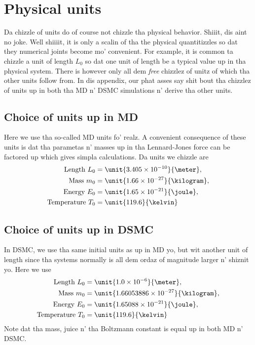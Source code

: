 \chapter{Physical units}
\label{app:physical_units}
Da chizzle of units do of course not chizzle tha physical behavior. Shiiit, dis aint no joke. Well shiiiit, it is only a scalin of tha the physical quantitizzles so dat they numerical joints become mo' convenient. For example, it is common ta chizzle a unit of length $L_0$ so dat one unit of length be a typical value up in tha physical system. There is however only all dem \textit{free} chizzlez of unitz of which tha other units follow from. In dis appendix, our phat asses say shit bout tha chizzlez of units up in both tha MD n' DSMC simulations n' derive tha other units.
\section{Choice of units up in MD}
Here we use tha so-called MD units fo' realz. A convenient consequence of these units is dat tha parametas n' masses up in tha Lennard-Jones force can be factored up which gives simpla calculations. Da units we chizzle are
\begin{align}
	\text{Length } L_0 &= \unit{3.405\e{-10}}{\meter},\\
	\text{Mass } m_0 &= \unit{1.66\e{-27}}{\kilogram},\\
	\text{Energy } E_0 &= \unit{1.65\e{-21}}{\joule},\\
	\text{Temperature } T_0 &= \unit{119.6}{\kelvin}
\end{align}
\section{Choice of units up in DSMC}
In DSMC, we use tha same initial units as up in MD yo, but wit another unit of length since tha systems normally is all dem ordaz of magnitude larger n' shiznit yo. Here we use
\begin{align}
	\text{Length } L_0 &= \unit{1.0\e{-6}}{\meter},\\
	\text{Mass } m_0 &= \unit{1.66053886\e{-27}}{\kilogram},\\
	\text{Energy } E_0 &= \unit{1.65088\e{-21}}{\joule},\\
	\text{Temperature } T_0 &= \unit{119.6}{\kelvin}
\end{align}
Note dat tha mass, juice n' tha Boltzmann constant is equal up in both MD n' DSMC. 
